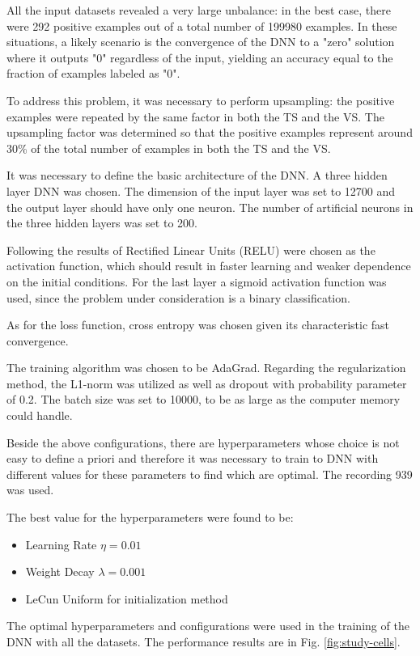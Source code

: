 \documentclass[10pt]{article}
\begin{document}
All the input datasets revealed a very large unbalance: in the best case, there were 292 positive examples out of a total number of 199980 examples. In these situations, a likely scenario is the convergence of the DNN to a "zero" solution where it outputs "0" regardless of the input, yielding an accuracy equal to the fraction of examples labeled as "0".

To address this problem, it was necessary to perform upsampling: the positive examples were repeated by the same factor in both the TS and the VS. The upsampling factor was determined so that the positive examples represent around 30\% of the total number of examples in both the TS and the VS.

It was necessary to define the basic architecture of the DNN. A three hidden layer DNN was chosen. The dimension of the input layer was set to 12700 and the output layer should have only one neuron. The number of artificial neurons in the three hidden layers was set to 200.

Following the results of \cite{glorot2011deep} Rectified Linear Units (RELU) were chosen as the activation function, which should result in faster learning and weaker dependence on the initial conditions. For the last layer a sigmoid activation function was used, since the problem under consideration is a binary classification.

As for the loss function, cross entropy was chosen given its characteristic fast convergence.

The training algorithm was chosen to be AdaGrad.
Regarding the regularization method, the L1-norm was utilized as well as dropout with probability parameter of 0.2.
The batch size was set to 10000, to be as large as the computer memory could handle.

Beside the above configurations, there are hyperparameters whose choice is not easy to define a priori and therefore it was necessary to train to DNN with different values for these parameters to find which are optimal. The recording 939 was used. 

The best value for the hyperparameters were found to be:
\begin{itemize}
\item Learning Rate $\eta = 0.01$
\item Weight Decay $\lambda = 0.001$
\item LeCun Uniform for initialization method
\end{itemize}

The optimal hyperparameters and configurations were used in the training of the DNN with all the datasets. The performance results are in Fig. \ref{fig:study-cells}.
\end{document}
